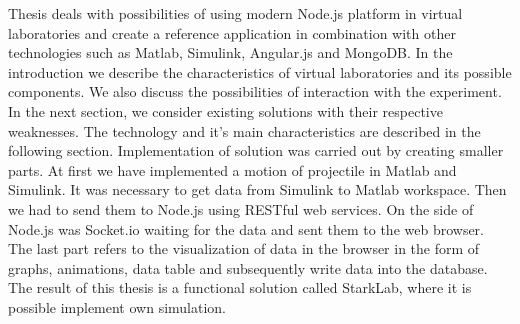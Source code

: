 Thesis deals with possibilities of using modern Node.js platform in virtual laboratories and create a reference application in combination with other technologies such as Matlab, Simulink, Angular.js and MongoDB. In the introduction we describe the characteristics of virtual laboratories and its possible components. We also discuss the possibilities of interaction with the experiment. In the next section, we consider existing solutions with their respective weaknesses. The technology and it's main characteristics are described in the following section. Implementation of solution was carried out by creating smaller parts. At first we have implemented a motion of projectile in Matlab and Simulink. It was necessary to get data from Simulink to Matlab workspace. Then we had to send them to Node.js using RESTful web services. On the side of Node.js was Socket.io waiting for the data and sent them to the web browser. The last part refers to the visualization of data in the browser in the form of graphs, animations, data table and subsequently write data into the database. The result of this thesis is a functional solution called StarkLab, where it is possible implement own simulation.